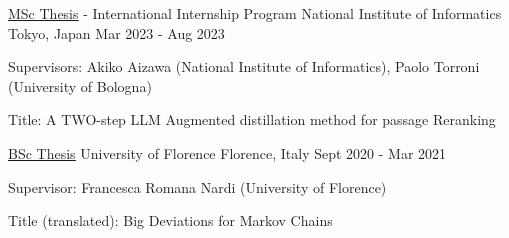 

\begin{cventries}

  \cventry
    {\href{https://amslaurea.unibo.it/30082/}{\underline{MSc Thesis}} - International Internship Program} %
    {National Institute of Informatics} %
    {Tokyo, Japan} %
    {Mar 2023 - Aug 2023} %
    {
      \begin{cvitems} %
        \item {Supervisors: Akiko Aizawa (National Institute of Informatics), Paolo Torroni (University of Bologna)} 
        \item {Title: A TWO-step LLM Augmented distillation method for passage Reranking}
      \end{cvitems}
    }

  \cventry
    {\href{https://github.com/Freddavide/Freddavide/blob/main/elaborato_B036_Baldelli_Davide.pdf}{\underline{BSc Thesis}}} %
    {University of Florence} %
    {Florence, Italy} %
    {Sept 2020 - Mar 2021} %
    {
      \begin{cvitems} %
        \item {Supervisor: Francesca Romana Nardi (University of Florence)}
        \item {Title (translated): Big Deviations for Markov Chains}
      \end{cvitems}
    }



\end{cventries}
